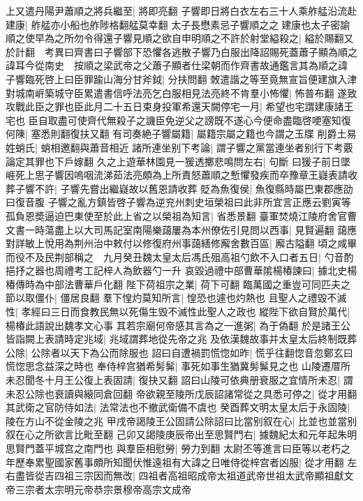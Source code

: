 上又遣丹陽尹蕭順之將兵繼至|{
	將即亮翻}
子響即日將白衣左右三十人乘舴艋沿流赴建康|{
	舴艋亦小船也舴陟格翻艋莫幸翻}
太子長懋素忌子響順之之建康也太子密諭順之使早為之所勿令得還子響見順之欲自申明順之不許於射堂縊殺之|{
	縊於賜翻又於計翻　考異曰齊書曰子響部下恐懼各逃散子響乃白服出降詔賜死蓋蕭子顯為順之諱耳今從南史　按順之梁武帝之父蕭子顯者仕梁朝而作齊書故通鑑言其為順之諱}
子響臨死啓上曰臣罪踰山海分甘斧鉞|{
	分扶問翻}
敇遣諧之等至竟無宣旨便建旗入津對城南㟁築城守臣累遣書信呼法亮乞白服相見法亮終不肯羣小怖懼|{
	怖普布翻}
遂致攻戰此臣之罪也臣此月二十五日束身投軍希還天闕停宅一月|{
	希望也宅謂建康諸王宅也}
臣自取盡可使齊代無殺子之譏臣免逆父之謗既不遂心今便命盡臨啓哽塞知復何陳|{
	塞悉則翻復扶又翻}
有司奏絶子響屬籍|{
	屬籍宗屬之籍也今謂之玉牒}
削爵土易姓蛸氏|{
	蛸相邀翻與蕭音相近}
諸所連坐别下考論|{
	謂子響之黨當連坐者别行下考覈論定其罪也下戶嫁翻}
久之上遊華林園見一猨透擲悲鳴問左右|{
	句斷}
曰猨子前日墜崕死上思子響因嗚咽流涕茹法亮頗為上所責怒蕭順之慙懼發疾而卒豫章王嶷表請收葬子響不許|{
	子響先嘗出繼嶷故以舊恩請收葬}
貶為魚復侯|{
	魚復縣時屬巴東郡應劭曰復音腹}
子響之亂方鎮皆啓子響為逆兖州刺史垣榮祖曰此非所宜言正應云劉寅等孤負恩奬逼迫巴東使至於此上省之以榮祖為知言|{
	省悉景翻}
臺軍焚燒江陵府舍官曹文書一時蕩盡上以大司馬記室南陽樂藹屢為本州僚佐引見問以西事|{
	見賢遍翻}
藹應對詳敏上悅用為荆州治中敕付以修復府州事藹繕修廨舍數百區|{
	廨古隘翻}
頃之咸畢而役不及民荆部稱之　九月癸丑魏太皇太后馮氏殂高祖勺飲不入口者五日|{
	勺音酌挹抒之器也周禮考工記梓人為飲器勺一升}
哀毀過禮中部曹華隂楊椿諫曰|{
	據北史楊椿傳時為中部法曹華戶化翻}
陛下荷祖宗之業|{
	荷下可翻}
臨萬國之重豈可同匹夫之節以取僵仆|{
	僵居良翻}
羣下惶灼莫知所言|{
	惶恐也遽也灼熱也}
且聖人之禮毀不滅性|{
	孝經曰三日而食教民無以死傷生毁不滅性此聖人之政也}
縱陛下欲自賢於萬代|{
	楊椿此語說出魏孝文心事}
其若宗廟何帝感其言為之一進粥|{
	為于偽翻}
於是諸王公皆詣闕上表請時定兆域|{
	兆域謂葬地從先帝之兆}
及依漢魏故事并太皇太后終制既葬公除|{
	公除者以天下為公而除服也}
詔曰自遭禍罰慌惚如昨|{
	慌乎往翻惚音忽鄭玄曰慌惚思念益深之時也}
奉侍梓宫猶希髣髴|{
	事死如事生猶冀髣髴見之也}
山陵遷厝所未忍聞冬十月王公復上表固請|{
	復抉又翻}
詔曰山陵可依典册衰服之宜情所未忍|{
	謂未忍公除也衰讀與縗同倉回翻}
帝欲親至陵所戊辰詔諸常從之具悉可停之|{
	從才用翻}
其武衛之官防侍如法|{
	法常法也不撤武衛備不虞也}
癸酉葬文明太皇太后于永固陵|{
	陵在方山不從金陵之兆}
甲戌帝謁陵王公固請公除詔曰比當别叙在心|{
	比並也並當别叙在心之所欲言比毗至翻}
己卯又謁陵庚辰帝出至思賢門右|{
	據魏紀太和元年起朱明思賢門蓋平城宫之南門也}
與羣臣相慰勞|{
	勞力到翻}
太尉丕等進言曰臣等以老朽之年歷奉累聖國家舊事頗所知聞伏惟遠祖有大諱之日唯侍從梓宫者凶服|{
	從才用翻}
左右盡皆從吉四祖三宗因而無改|{
	四祖者高祖昭成帝太祖道武帝世祖太武帝顯祖獻文帝三宗者太宗明元帝恭宗景穆帝高宗文成帝}
